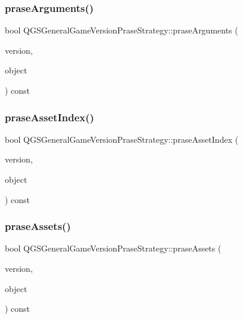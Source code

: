 \subsubsection{\texorpdfstring{prase\+Arguments()}{praseArguments()}}
{\footnotesize\ttfamily bool Q\+G\+S\+General\+Game\+Version\+Prase\+Strategy\+::prase\+Arguments (\begin{DoxyParamCaption}\item[{\mbox{\hyperlink{class_q_g_s_game_version}{Q\+G\+S\+Game\+Version}} \&}]{version,  }\item[{const Q\+Json\+Object \&}]{object }\end{DoxyParamCaption}) const\hspace{0.3cm}{\ttfamily [protected]}}

\mbox{\label{class_q_g_s_general_game_version_prase_strategy_ab2a6105f5d1f4423dfd68e343632c8c3}} 
\subsubsection{\texorpdfstring{prase\+Asset\+Index()}{praseAssetIndex()}}
{\footnotesize\ttfamily bool Q\+G\+S\+General\+Game\+Version\+Prase\+Strategy\+::prase\+Asset\+Index (\begin{DoxyParamCaption}\item[{\mbox{\hyperlink{class_q_g_s_game_version}{Q\+G\+S\+Game\+Version}} \&}]{version,  }\item[{const Q\+Json\+Object \&}]{object }\end{DoxyParamCaption}) const\hspace{0.3cm}{\ttfamily [protected]}}

\mbox{\label{class_q_g_s_general_game_version_prase_strategy_a3248b9bc00727b8c44727333cfd32bc2}} 
\subsubsection{\texorpdfstring{prase\+Assets()}{praseAssets()}}
{\footnotesize\ttfamily bool Q\+G\+S\+General\+Game\+Version\+Prase\+Strategy\+::prase\+Assets (\begin{DoxyParamCaption}\item[{\mbox{\hyperlink{class_q_g_s_game_version}{Q\+G\+S\+Game\+Version}} \&}]{version,  }\item[{const Q\+Json\+Object \&}]{object }\end{DoxyParamCaption}) const\hspace{0.3cm}{\ttfamily [protected]}}

